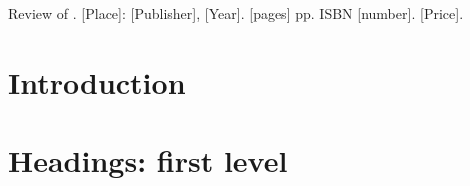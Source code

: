 
\begin{review}
\renewcommand*{\pagemark}{}


\begin{reviewed}
Review of \thecontribution. {[}Place{]}: {[}Publisher{]}, {[}Year{]}. {[}pages{]} pp. ISBN {[}number{]}. {[}Price{]}.
\end{reviewed}





\section{Introduction}
\lipsum[2]
\lipsum[3]


\section{Headings: first level}
\label{sec:headings}


\end{review}
